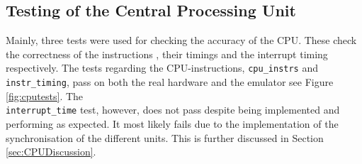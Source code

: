 \subsection{Testing of the Central Processing Unit}
Mainly, three tests were used for checking the accuracy of the CPU. These check the correctness of the instructions \cite{Blargg}, their timings and the interrupt timing respectively. The tests regarding the CPU-instructions, \texttt{cpu\_instrs} and \texttt{instr\_timing}, pass on both the real hardware \cite{TestROMsResult} and the emulator see Figure \ref{fig:cputests}. The \\\texttt{interrupt\_time} test, however, does not pass despite being implemented and performing as expected. It most likely fails due to the implementation of the synchronisation of the different units. This is further discussed in Section \ref{sec:CPUDiscussion}. 

